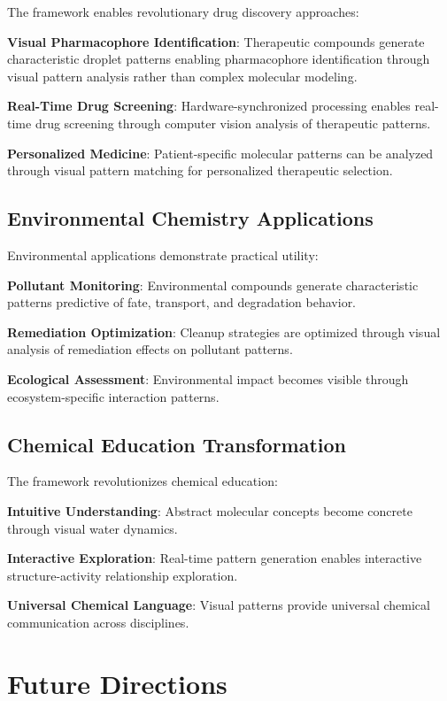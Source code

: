 \documentclass[12pt,a4paper]{article}
\begin{document}
The framework enables revolutionary drug discovery approaches:

\textbf{Visual Pharmacophore Identification}: Therapeutic compounds generate characteristic droplet patterns enabling pharmacophore identification through visual pattern analysis rather than complex molecular modeling.

\textbf{Real-Time Drug Screening}: Hardware-synchronized processing enables real-time drug screening through computer vision analysis of therapeutic patterns.

\textbf{Personalized Medicine}: Patient-specific molecular patterns can be analyzed through visual pattern matching for personalized therapeutic selection.

\subsection{Environmental Chemistry Applications}

Environmental applications demonstrate practical utility:

\textbf{Pollutant Monitoring}: Environmental compounds generate characteristic patterns predictive of fate, transport, and degradation behavior.

\textbf{Remediation Optimization}: Cleanup strategies are optimized through visual analysis of remediation effects on pollutant patterns.

\textbf{Ecological Assessment}: Environmental impact becomes visible through ecosystem-specific interaction patterns.

\subsection{Chemical Education Transformation}

The framework revolutionizes chemical education:

\textbf{Intuitive Understanding}: Abstract molecular concepts become concrete through visual water dynamics.

\textbf{Interactive Exploration}: Real-time pattern generation enables interactive structure-activity relationship exploration.

\textbf{Universal Chemical Language}: Visual patterns provide universal chemical communication across disciplines.

\section{Future Directions}
\end{document}
